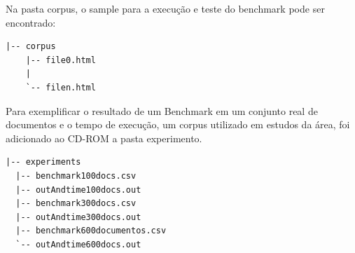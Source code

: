 \documentclass[12pt, a4paper]{article}
\begin{document}
Na pasta corpus, o sample para a execução e teste do benchmark pode ser
encontrado:

\begin{verbatim}
|-- corpus
    |-- file0.html 
    |
    `-- filen.html
\end{verbatim}

Para exemplificar o resultado de um Benchmark em um conjunto real de
documentos e o tempo de execução, um corpus utilizado em estudos da área,
foi adicionado ao CD-ROM a pasta experimento.

\begin{verbatim}
|-- experiments
  |-- benchmark100docs.csv
  |-- outAndtime100docs.out
  |-- benchmark300docs.csv
  |-- outAndtime300docs.out
  |-- benchmark600documentos.csv
  `-- outAndtime600docs.out
\end{verbatim}




\end{document}
